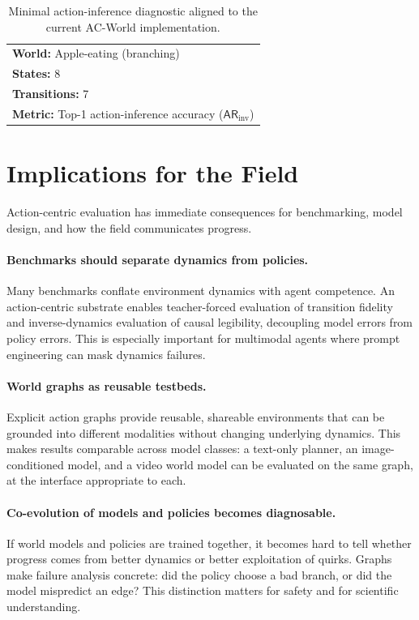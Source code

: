 \documentclass{article}
\theoremstyle{plain}
\theoremstyle{definition}
\theoremstyle{remark}
\begin{document}
\begin{table}[t]
  \centering
  \small
  \caption{Minimal action-inference diagnostic aligned to the current AC-World implementation.}
  \label{tab:minimal_diagnostic}
  \begin{tabular}{l}
  \toprule
  \textbf{World:} Apple-eating (branching) \\
  \textbf{States:} 8 \\
  \textbf{Transitions:} 7 \\
  \textbf{Metric:} Top-1 action-inference accuracy ($\mathsf{AR}_{\text{inv}}$) \\
  \bottomrule
  \end{tabular}
  \end{table}

\section{Implications for the Field}
Action-centric evaluation has immediate consequences for benchmarking, model design, and how the field communicates progress.

\paragraph{Benchmarks should separate dynamics from policies.}
Many benchmarks conflate environment dynamics with agent competence. An action-centric substrate enables teacher-forced evaluation of transition fidelity and inverse-dynamics evaluation of causal legibility, decoupling model errors from policy errors. This is especially important for multimodal agents where prompt engineering can mask dynamics failures.

\paragraph{World graphs as reusable testbeds.}
Explicit action graphs provide reusable, shareable environments that can be grounded into different modalities without changing underlying dynamics. This makes results comparable across model classes: a text-only planner, an image-conditioned model, and a video world model can be evaluated on the same graph, at the interface appropriate to each.

\paragraph{Co-evolution of models and policies becomes diagnosable.}
If world models and policies are trained together, it becomes hard to tell whether progress comes from better dynamics or better exploitation of quirks. Graphs make failure analysis concrete: did the policy choose a bad branch, or did the model mispredict an edge? This distinction matters for safety and for scientific understanding.
\end{document}
